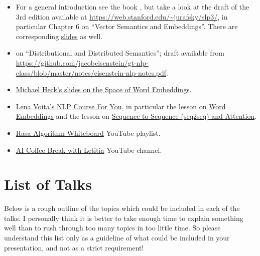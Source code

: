 \documentclass[11pt, a4paper]{amsart}
\begin{document}
\begin{itemize}
    \item For a general introduction see the book \cite{jurafsky2009speech}, but take a look at the draft of the 3rd edition available at \url{https://web.stanford.edu/~jurafsky/slp3/}, in particular Chapter 6 on ``Vector Semantics and Embeddings''.
    There are corresponding \href{https://web.stanford.edu/~jurafsky/slp3/slides/6_Vector_Apr18_2021.pdf}{slides} as well.

    \item \cite[Chp.~14]{eisenstein2019introduction} on ``Distributional and Distributed Semantics'';
    draft available from \url{https://github.com/jacobeisenstein/gt-nlp-class/blob/master/notes/eisenstein-nlp-notes.pdf}.

    \item \href{https://www.cs.hhu.de/fileadmin/redaktion/Fakultaeten/Mathematisch-Naturwissenschaftliche_Fakultaet/Informatik/Dialog_Systems_and_Machine_Learning/20190705_word_embeddings.pdf}{Michael Heck's slides on the Space of Word Embeddings}.
    
    \item \href{https://lena-voita.github.io/nlp_course}{Lena Voita's NLP Course For You}, in particular the lesson on \href{https://lena-voita.github.io/nlp_course/word_embeddings}{Word Embeddings} and the lesson on \href{https://lena-voita.github.io/nlp_course/seq2seq_and_attention.html}{Sequence to Sequence (seq2seq) and Attention}.
    
    \item \href{https://youtube.com/playlist?list=PL75e0qA87dlG-za8eLI6t0_Pbxafk-cxb}{Rasa Algorithm Whiteboard} YouTube playlist.
    
    \item \href{https://www.youtube.com/c/aicoffeebreak}{AI Coffee Break with Letitia} YouTube channel.
\end{itemize}

\section{List of Talks}

Below is a rough outline of the topics which could be included in each of the talks.
I personally think it is better to take enough time to explain something well than to rush through too many topics in too little time.
So please understand this list only as a guideline of what could be included in your presentation, and not as a strict requirement!
\end{document}

